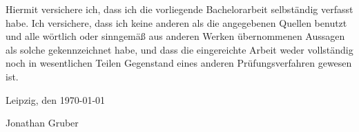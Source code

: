 
Hiermit versichere ich, dass ich die vorliegende Bachelorarbeit selbständig verfasst habe. Ich versichere, dass ich keine anderen als die angegebenen Quellen benutzt und alle wörtlich oder sinngemäß aus anderen Werken übernommenen Aussagen als solche gekennzeichnet habe, und dass die eingereichte Arbeit weder vollständig noch in wesentlichen Teilen Gegenstand eines anderen Prüfungsverfahren gewesen ist.

Leipzig, den \today
\vspace{0.5cm}

\makebox[4cm]{\hrulefill}
\newline\vspace{1cm}
Jonathan Gruber
